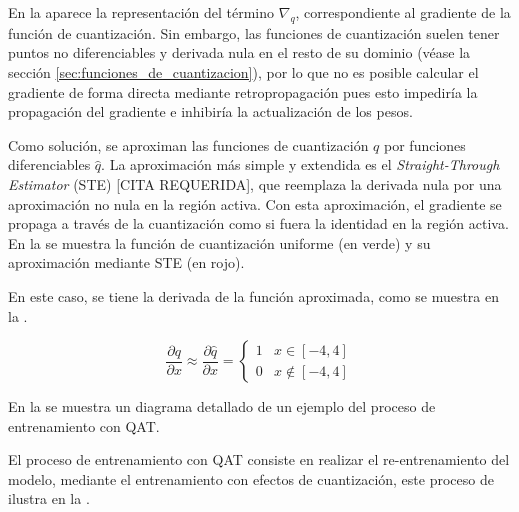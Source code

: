 
En la  aparece la representación del término $\nabla_q$, correspondiente al gradiente de la función de cuantización. Sin embargo, las funciones de cuantización suelen tener puntos no diferenciables y derivada nula en el resto de su dominio (véase la sección \ref{sec:funciones_de_cuantizacion}), por lo que no es posible calcular el gradiente de forma directa mediante retropropagación pues esto impediría la propagación del gradiente e inhibiría la actualización de los pesos.

Como solución, se aproximan las funciones de cuantización $q$ por funciones diferenciables $\hat{q}$. La aproximación más simple y extendida es el \textit{Straight-Through Estimator} (STE) [CITA REQUERIDA], que reemplaza la derivada nula por una aproximación no nula en la región activa. Con esta aproximación, el gradiente se propaga a través de la cuantización como si fuera la identidad en la región activa. En la  se muestra la función de cuantización uniforme (en verde) y su aproximación mediante STE (en rojo).


En este caso, se tiene la derivada de la función aproximada, como se muestra en la .

\begin{equation}
    \label{eq:ste_idea}
    \frac{\partial q}{\partial x} \approx
    \frac{\partial \hat{q}}{\partial x} =
    \begin{cases}
        1 & x \in [-4, 4] \\
        0 & x \notin [-4, 4]
    \end{cases}
\end{equation}

En la  se muestra un diagrama detallado de un ejemplo del proceso de entrenamiento con QAT.


El proceso de entrenamiento con QAT consiste en realizar el re-entrenamiento del modelo, mediante el entrenamiento con efectos de cuantización, este proceso de ilustra en la .

